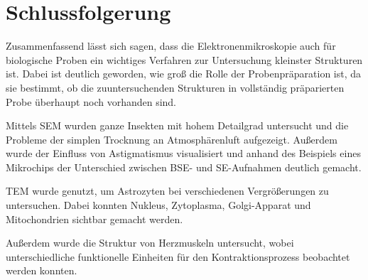 \newpage
\section{Schlussfolgerung}

  Zusammenfassend lässt sich sagen, dass die Elektronenmikroskopie auch für biologische Proben ein wichtiges Verfahren  zur Untersuchung kleinster Strukturen ist.
  Dabei ist deutlich geworden, wie groß die Rolle der Probenpräparation ist, da sie bestimmt, ob die zuuntersuchenden Strukturen in vollständig präparierten Probe überhaupt noch vorhanden sind.

  Mittels SEM wurden ganze Insekten mit hohem Detailgrad untersucht und die Probleme der simplen Trocknung an Atmosphärenluft aufgezeigt.
  Außerdem wurde der Einfluss von Astigmatismus visualisiert und anhand des Beispiels eines Mikrochips der Unterschied zwischen BSE- und SE-Aufnahmen deutlich gemacht.

  TEM wurde genutzt, um Astrozyten bei verschiedenen Vergrößerungen zu untersuchen.
  Dabei konnten Nukleus, Zytoplasma, Golgi-Apparat und Mitochondrien sichtbar gemacht werden.

  Außerdem wurde die Struktur von Herzmuskeln untersucht, wobei unterschiedliche funktionelle Einheiten für den Kontraktionsprozess beobachtet werden konnten.
